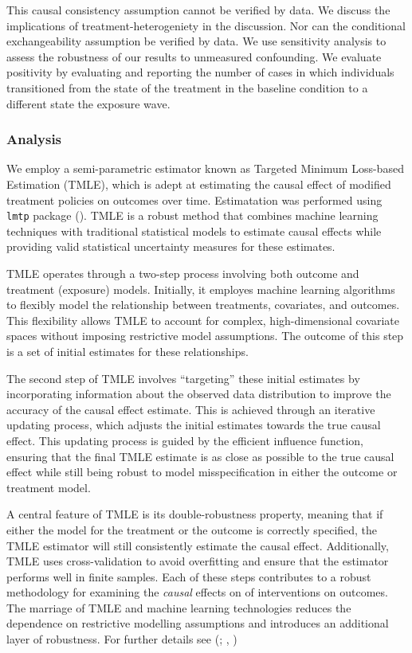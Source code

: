 \documentclass[
  singlecolumn]{article}
\begin{document}
This causal consistency assumption cannot be verified by data. We
discuss the implications of treatment-heterogeniety in the discussion.
Nor can the conditional exchangeability assumption be verified by data.
We use sensitivity analysis to assess the robustness of our results to
unmeasured confounding. We evaluate positivity by evaluating and
reporting the number of cases in which individuals transitioned from the
state of the treatment in the baseline condition to a different state
the exposure wave.

\subsubsection{Analysis}\label{analysis}

We employ a semi-parametric estimator known as Targeted Minimum
Loss-based Estimation (TMLE), which is adept at estimating the causal
effect of modified treatment policies on outcomes over time.
Estimatation was performed using \texttt{lmtp} package
(). TMLE is a robust
method that combines machine learning techniques with traditional
statistical models to estimate causal effects while providing valid
statistical uncertainty measures for these estimates.

TMLE operates through a two-step process involving both outcome and
treatment (exposure) models. Initially, it employes machine learning
algorithms to flexibly model the relationship between treatments,
covariates, and outcomes. This flexibility allows TMLE to account for
complex, high-dimensional covariate spaces without imposing restrictive
model assumptions. The outcome of this step is a set of initial
estimates for these relationships.

The second step of TMLE involves ``targeting'' these initial estimates
by incorporating information about the observed data distribution to
improve the accuracy of the causal effect estimate. This is achieved
through an iterative updating process, which adjusts the initial
estimates towards the true causal effect. This updating process is
guided by the efficient influence function, ensuring that the final TMLE
estimate is as close as possible to the true causal effect while still
being robust to model misspecification in either the outcome or
treatment model.

A central feature of TMLE is its double-robustness property, meaning
that if either the model for the treatment or the outcome is correctly
specified, the TMLE estimator will still consistently estimate the
causal effect. Additionally, TMLE uses cross-validation to avoid
overfitting and ensure that the estimator performs well in finite
samples. Each of these steps contributes to a robust methodology for
examining the \emph{causal} effects on of interventions on outcomes. The
marriage of TMLE and machine learning technologies reduces the
dependence on restrictive modelling assumptions and introduces an
additional layer of robustness. For further details see
(;
,
)
\end{document}
